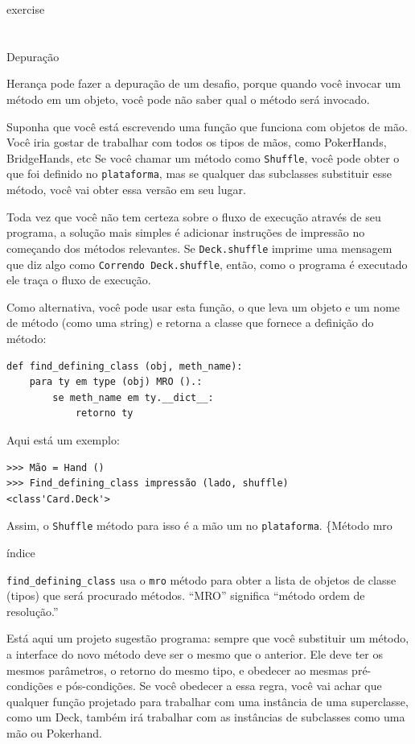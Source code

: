 \documentclass[10pt]{book}
\begin{document}
\begin{exercise}
\begin{v erbatim}
{\begin{}
\end{} exercise


\section{} Depuração

Herança pode fazer a depuração de um desafio, porque quando você
invocar um método em um objeto, você pode não saber qual o método
será invocado.

Suponha que você está escrevendo uma função que funciona com objetos de mão.
Você iria gostar de trabalhar com todos os tipos de mãos, como
PokerHands, BridgeHands, etc Se você chamar um método como
{\tt Shuffle}, você pode obter o que foi definido no {\tt plataforma},
mas se qualquer das subclasses substituir esse método, você vai
obter essa versão em seu lugar.  

Toda vez que você não tem certeza sobre o fluxo de execução através de seu
programa, a solução mais simples é adicionar instruções de impressão no
começando dos métodos relevantes. Se {\tt Deck.shuffle} imprime uma
mensagem que diz algo como {\tt Correndo Deck.shuffle}, então, como
o programa é executado ele traça o fluxo de execução.

Como alternativa, você pode usar esta função, o que leva um
objeto e um nome de método (como uma string) e retorna a classe que
fornece a definição do método:

\begin{verbatim}
def find_defining_class (obj, meth_name):
    para ty em type (obj) MRO ().:
        se meth_name em ty.__dict__:
            retorno ty
\end{verbatim}
%
Aqui está um exemplo:

\begin{verbatim}
>>> Mão = Hand ()
>>> Find_defining_class impressão (lado, shuffle)
<class'Card.Deck'>
\end{verbatim}
%
Assim, o {\tt Shuffle} método para isso é a mão um no {\tt plataforma}.
\{Método mro} índice

\Verb "find_defining_class" usa o {\tt mro} método para obter a lista
de objetos de classe (tipos) que será procurado métodos. ``MRO''
significa ``método ordem de resolução.''

Está aqui um projeto sugestão programa: sempre que você substituir um método,
a interface do novo método deve ser o mesmo que o anterior. Ele
deve ter os mesmos parâmetros, o retorno do mesmo tipo, e obedecer ao
mesmas pré-condições e pós-condições. Se você obedecer a essa regra, você
vai achar que qualquer função projetado para trabalhar com uma instância de uma
superclasse, como um Deck, também irá trabalhar com as instâncias de subclasses
como uma mão ou Pokerhand.


\end{v erbatim}
\end{exercise}
\end{document}
